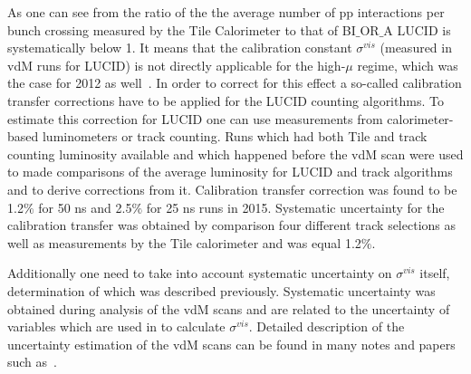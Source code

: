As one can see from  the ratio of the the average number of pp interactions per bunch crossing
measured by the Tile Calorimeter to that of BI$\_$OR$\_$A LUCID is systematically below 1. 
It means that the calibration constant $\sigma^{vis}$ (measured in vdM runs for LUCID) is not directly applicable for the high-$\mu$ regime, 
which was the case for 2012 as well~\cite{Aaboud:2016hhf}.
In order to correct for this effect a so-called calibration transfer corrections have to be applied for the LUCID counting algorithms.
To estimate this correction for LUCID one can use measurements from calorimeter-based luminometers or track counting.
Runs which had both Tile and track counting luminosity available and which happened before the vdM scan were used to made comparisons of the average luminosity for LUCID and track algorithms
and to derive corrections from it. Calibration transfer correction was found to be 1.2$\%$ for 50 ns and 2.5$\%$ for 25 ns runs in 2015.
Systematic uncertainty for the calibration transfer was obtained by comparison four different track selections as well as measurements by the Tile calorimeter
and was equal 1.2$\%$.

Additionally one need to take into account systematic uncertainty on $\sigma^{vis}$ itself, determination of which was described previously.
Systematic uncertainty was obtained during analysis of the vdM scans and are related to the uncertainty of variables which are used in
 to calculate $\sigma^{vis}$. 
Detailed description of the uncertainty estimation of the vdM scans can be found in many notes and papers such 
as~\cite{ATLAS:2010uca,ATLAS-CONF-2011-011,ATLAS:2011cia,ATLAS:2012roa,Aad:2011dr,Aad:2013ucp,Aaboud:2016hhf}.

